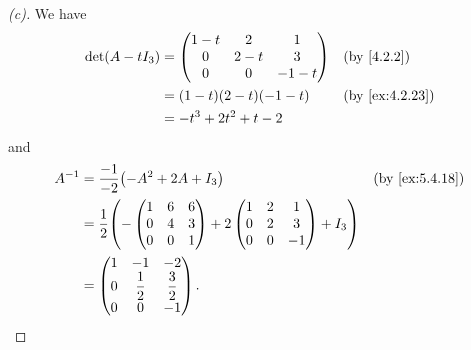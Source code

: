 \begin{proof}[(c)]
  We have
  \begin{align*}
    \det(A - t I_3) & = \begin{pmatrix}
                          1 - t & 2     & 1      \\
                          0     & 2 - t & 3      \\
                          0     & 0     & -1 - t
                        \end{pmatrix} &  & \by{4.2.2}               \\
                    & = (1 - t)(2 - t)(-1 - t)  &  & \by{ex:4.2.23} \\
                    & = -t^3 + 2t^2 + t - 2
  \end{align*}
  and
  \begin{align*}
    A^{-1} & = \dfrac{-1}{-2} \pa{-A^2 + 2A + I_3} &  & \by{ex:5.4.18} \\
           & = \dfrac{1}{2} \pa{-\begin{pmatrix}
                                     1 & 6 & 6 \\
                                     0 & 4 & 3 \\
                                     0 & 0 & 1
                                   \end{pmatrix} + 2\begin{pmatrix}
                                                      1 & 2 & 1  \\
                                                      0 & 2 & 3  \\
                                                      0 & 0 & -1
                                                    \end{pmatrix} + I_3} \\
           & = \begin{pmatrix}
                 1 & -1           & -2           \\
                 0 & \dfrac{1}{2} & \dfrac{3}{2} \\
                 0 & 0            & -1
               \end{pmatrix}.
  \end{align*}
\end{proof}

